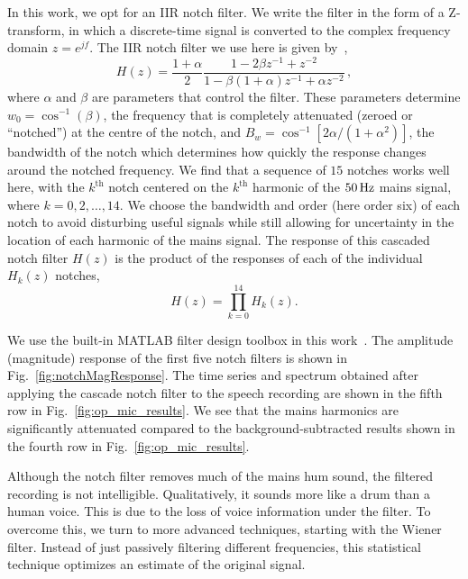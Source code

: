 \documentclass[aps,pra,superscriptaddress,reprint]{revtex4-2}
\begin{document}
In this work, we opt for an IIR notch filter. 
We write the filter in the form of a Z-transform, in which a discrete-time signal is converted to the complex frequency domain $z=e^{jf}$. 
The IIR notch filter we use here is given by~\citep{10.5555/541204}, 
\begin{equation}
    \label{eqn:notch}
    H(z)=\frac{1+\alpha}{2}\frac{1-2\beta z^{-1}+z^{-2}}{1-\beta(1+\alpha)z^{-1}+\alpha z^{-2}}\,,
\end{equation}
where $\alpha$ and $\beta$ are parameters that control the filter. 
These parameters determine $w_0=\cos^{-1}(\beta)$, the frequency that is completely attenuated (zeroed or ``notched'') at the centre of the notch, and $B_w=\cos^{-1}[2\alpha/(1+\alpha^2)]$, the bandwidth of the notch which determines how quickly the response changes around the notched frequency.
We find that a sequence of $15$ notches works well here, with the $k^\mathrm{th}$ notch centered on the $k^\mathrm{th}$ harmonic of the $50\,{\rm Hz}$ mains signal, where $k=0,2,\dots,14$. 
We choose the bandwidth and order (here order six) of each notch to avoid disturbing useful signals while still allowing for uncertainty in the location of each harmonic of the mains signal. The response of this cascaded notch filter $H(z)$ is the product of the responses of each of the individual $H_k(z)$ notches,
\begin{equation}
    \label{eqn:notch15}
    H(z) = \prod_{k=0}^{14} H_k(z).
\end{equation}

We use the built-in MATLAB filter design toolbox in this work~\cite{MATLAB}. 
The amplitude (magnitude) response of the first five notch filters is shown in Fig.~\ref{fig:notchMagResponse}. 
The time series and spectrum obtained after applying the cascade notch filter to the speech recording are shown in the fifth row in Fig.~\ref{fig:op_mic_results}.
We see that the mains harmonics are significantly attenuated compared to the background-subtracted results shown in the fourth row in Fig.~\ref{fig:op_mic_results}.

Although the notch filter removes much of the mains hum sound, the filtered recording is not intelligible. Qualitatively, it sounds more like a drum than a human voice. This is due to the loss of voice information under the filter.
To overcome this, we turn to more advanced techniques, starting with the Wiener filter. Instead of just passively filtering different frequencies, this statistical technique optimizes an estimate of the original signal. 
\end{document}
